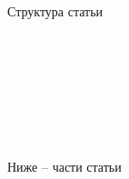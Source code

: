 



{\huge Структура статьи}

\\
\\
\\
\\
\\
\\
\\
{\huge Ниже -- части статьи}
\setcounter{section}{1}
\newpage

% 













% 



